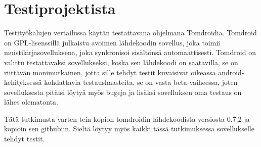 \section{Testiprojektista}

Testityökalujen vertailussa käytän testattavana ohjelmana Tomdroidia. Tomdroid on GPL-lisenssillä julkaistu avoimen lähdekoodin sovellus, joka toimii muistikirjasovelluksena, joka synkronisoi sisältönsä automaattisesti. \cite{tomdroid} Tomdroid on valittu testattavaksi sovellukseksi, koska sen lähdekoodi on saatavilla, se on riittävän monimutkainen, jotta sille tehdyt testit kuvaisivat oikeassa android-kehityksessä kohdattavia testaushaasteita, se on vasta beta-vaiheessa, joten sovelluksesta pitäisi löytyä myös bugeja ja lisäksi sovelluksen oma testaus on lähes olematonta.

Tätä tutkimusta varten tein kopion tomdroidin lähdekoodista versiosta 0.7.2 ja kopioin sen githubiin. Sieltä löytyy myös kaikki tässä tutkimuksessa sovellukselle tehdyt testit. \cite{tomdroid_github}